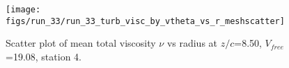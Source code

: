 \begin{figure}[H]
\centering
\texttt{[image: figs/run\_33/run\_33\_turb\_visc\_by\_vtheta\_vs\_r\_meshscatter]}
\caption{Scatter plot of mean total viscosity $\nu$ vs radius at $z/c$=8.50, $V_{free}$=19.08, station 4.}
\label{fig:run_33_turb_visc_by_vtheta_vs_r_meshscatter}
\end{figure}


